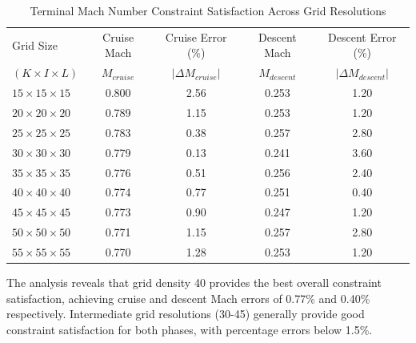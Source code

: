 \begin{table}[h]
    \centering
    \footnotesize
    \begin{tabular}{l c c c c}
        \hline
        Grid Size & Cruise Mach & Cruise Error (\%) & Descent Mach & Descent Error (\%)\\
        $(K \times I \times L)$ & $M_{cruise}$ & $|\Delta M_{cruise}|$ & $M_{descent}$ & $|\Delta M_{descent}|$  \\
        \hline
        $15 \times 15 \times 15$ & 0.800 & 2.56 & 0.253 & 1.20 \\
        $20 \times 20 \times 20$ & 0.789 & 1.15 & 0.253 & 1.20 \\
        $25 \times 25 \times 25$ & 0.783 & 0.38 & 0.257 & 2.80 \\
        $30 \times 30 \times 30$ & 0.779 & 0.13 & 0.241 & 3.60 \\
        $35 \times 35 \times 35$ & 0.776 & 0.51 & 0.256 & 2.40 \\
        $40 \times 40 \times 40$ & 0.774 & 0.77 & 0.251 & 0.40 \\
        $45 \times 45 \times 45$ & 0.773 & 0.90 & 0.247 & 1.20 \\
        $50 \times 50 \times 50$ & 0.771 & 1.15 & 0.257 & 2.80 \\
        $55 \times 55 \times 55$ & 0.770 & 1.28 & 0.253 & 1.20 \\
        \hline
    \end{tabular}
    \caption{Terminal Mach Number Constraint Satisfaction Across Grid Resolutions}
    \label{tab:mach_errors_percent}
\end{table}





The analysis reveals that grid density 40 provides the best overall constraint satisfaction, achieving cruise and descent Mach errors of 0.77\% and 0.40\% respectively. Intermediate grid resolutions (30-45) generally provide good constraint satisfaction for both phases, with percentage errors below 1.5\%. 

